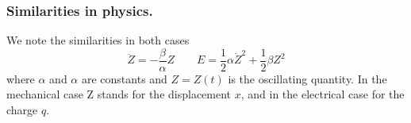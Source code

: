 \documentclass[../../../main.tex]{subfiles}
\begin{document}
\subsubsection*{Similarities in physics.} We note the similarities in both cases 
\begin{equation*}
    \ddot{Z}=-\frac{\beta}{\alpha}Z\qquad E=\frac{1}{2}\alpha\dot{Z}^2+\frac{1}{2}\beta Z^2
\end{equation*}
where $\alpha$ and $\alpha$ are constants and $Z = Z(t)$ is the oscillating quantity. In the mechanical case Z stands for the displacement $x$, and in the electrical case for the charge $q$.
\end{document}
